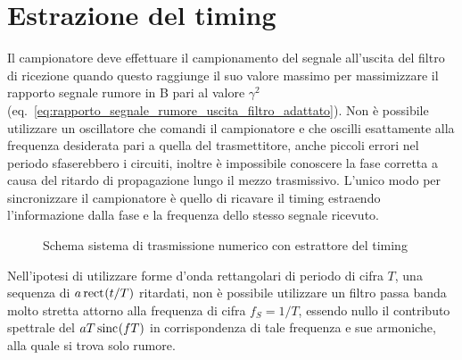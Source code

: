 \section{Estrazione del timing}
Il campionatore deve effettuare il campionamento del segnale all'uscita del filtro di ricezione quando questo raggiunge il suo valore massimo per massimizzare il rapporto segnale rumore in B pari al valore $\gamma^2$ (eq.~\ref{eq:rapporto_segnale_rumore_uscita_filtro_adattato}). Non è possibile utilizzare un oscillatore che comandi il campionatore e che oscilli esattamente alla frequenza desiderata pari a quella del trasmettitore, anche piccoli errori nel periodo sfaserebbero i circuiti, inoltre è impossibile conoscere la fase corretta a causa del ritardo di propagazione lungo il mezzo trasmissivo. L'unico modo per sincronizzare il campionatore è quello di ricavare il timing estraendo l'informazione dalla fase e la frequenza dello stesso segnale ricevuto.
\begin{figure}[!ht]
	\centering
	\caption{Schema sistema di trasmissione numerico con estrattore del timing}
	\label{fig:schema_sistema_trasmissione_numerico_timing}
\end{figure}

Nell'ipotesi di utilizzare forme d'onda rettangolari di periodo di cifra $T$, una sequenza di $a\,{\operatorname{rect}}^{}\!\left({t/T}\right)$ ritardati, non è possibile utilizzare un filtro passa banda molto stretta attorno alla frequenza di cifra $f_S=1/T$, essendo nullo il contributo spettrale del $a T\,{\operatorname{sinc}}^{}\!\left({f T}\right)$ in corrispondenza di tale frequenza e sue armoniche, alla quale si trova solo rumore.

